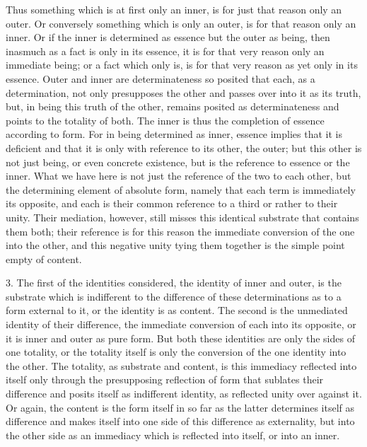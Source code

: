 Thus something which is at first only an inner,
is for just that reason only an outer.
Or conversely something which is only an outer,
is for that reason only an inner.
Or if the inner is determined as essence
but the outer as being,
then inasmuch as a fact is only in its essence,
it is for that very reason only an immediate being;
or a fact which only is, is for that very reason
as yet only in its essence.
Outer and inner are determinateness
so posited that each, as a determination,
not only presupposes the other
and passes over into it as its truth,
but, in being this truth of the other,
remains posited as determinateness
and points to the totality of both.
The inner is thus the completion
of essence according to form.
For in being determined as inner,
essence implies that it is deficient
and that it is only with reference to
its other, the outer;
but this other is not just being,
or even concrete existence,
but is the reference to essence or the inner.
What we have here is not just
the reference of the two to each other,
but the determining element of absolute form,
namely that each term is immediately its opposite,
and each is their common reference
to a third or rather to their unity.
Their mediation, however, still misses
this identical substrate that contains them both;
their reference is for this reason
the immediate conversion of the one into the other,
and this negative unity tying them together is
the simple point empty of content.

3. The first of the identities considered,
the identity of inner and outer,
is the substrate which is indifferent
to the difference of these determinations
as to a form external to it,
or the identity is as content.
The second is the unmediated identity of their difference,
the immediate conversion of each into its opposite,
or it is inner and outer as pure form.
But both these identities are only
the sides of one totality,
or the totality itself is only the
conversion of the one identity into the other.
The totality, as substrate and content,
is this immediacy reflected into itself
only through the presupposing reflection
of form that sublates their difference
and posits itself as indifferent identity,
as reflected unity over against it.
Or again, the content is the form itself
in so far as the latter determines itself as difference
and makes itself into one side of this difference as externality,
but into the other side as an immediacy
which is reflected into itself,
or into an inner.

